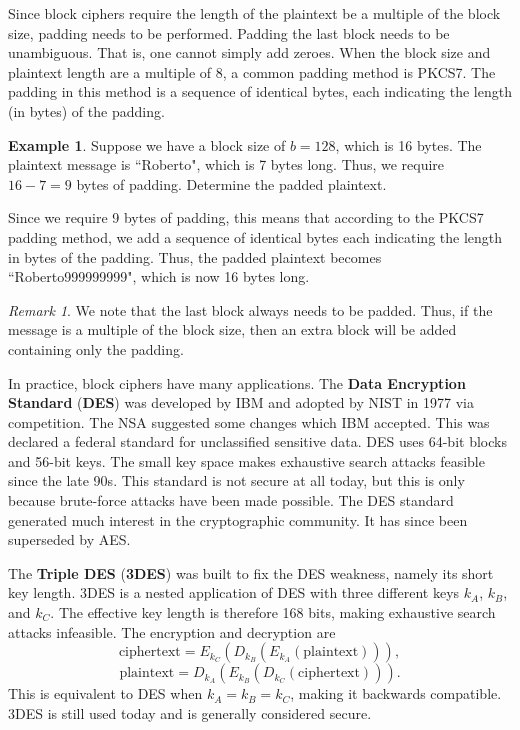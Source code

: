 \documentclass[11pt]{article}
\theoremstyle{plain} %
\theoremstyle{definition}
\theoremstyle{example}
\newtheorem*{example}{Example}
\theoremstyle{remark}
\newtheorem*{remark}{Remark}
\begin{document}
Since block ciphers require the length of the plaintext be a multiple of the block size, padding needs to be performed. Padding the last block needs to be unambiguous. That is, one cannot simply add zeroes. When the block size and plaintext length are a multiple of 8, a common padding method is PKCS7. The padding in this method is a sequence of identical bytes, each indicating the length (in bytes) of the padding. 

\begin{example}
Suppose we have a block size of $b=128$, which is 16 bytes. The plaintext message is ``Roberto", which is 7 bytes long. Thus, we require $16-7=9$ bytes of padding. Determine the padded plaintext. 
\end{example}

Since we require 9 bytes of padding, this means that according to the PKCS7 padding method, we add a sequence of identical bytes each indicating the length in bytes of the padding. Thus, the padded plaintext becomes ``Roberto999999999", which is now 16 bytes long. 

\begin{remark}
We note that the last block always needs to be padded. Thus, if the message is a multiple of the block size, then an extra block will be added containing only the padding. 
\end{remark}

In practice, block ciphers have many applications. The \textbf{Data Encryption Standard} (\textbf{DES}) was developed by IBM and adopted by NIST in 1977 via competition. The NSA suggested some changes which IBM accepted. This was declared a federal standard for unclassified sensitive data. DES uses 64-bit blocks and 56-bit keys. The small key space makes exhaustive search attacks feasible since the late 90s. This standard is not secure at all today, but this is only because brute-force attacks have been made possible. The DES standard generated much interest in the cryptographic community. It has since been superseded by AES. 

The \textbf{Triple DES} (\textbf{3DES}) was built to fix the DES weakness, namely its short key length. 
3DES is a nested application of DES with three different keys $k_A$, $k_B$, and $k_C$. The effective key length is therefore 168 bits, making exhaustive search attacks infeasible. The encryption and decryption are
$$\text{ciphertext} = E_{k_C}(D_{k_B}(E_{k_A}(\text{plaintext}))),$$
$$\text{plaintext} = D_{k_A}(E_{k_B}(D_{k_C}(\text{ciphertext}))).$$
This is equivalent to DES when $k_A = k_B = k_C$, making it backwards compatible. 3DES is still used today and is generally considered secure. 
\end{document}
